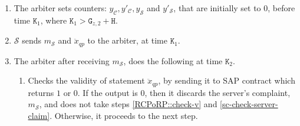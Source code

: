 \begin{enumerate}
\begin{enumerate}




 
 

\item The arbiter sets  counters: $y_{\scriptscriptstyle\mathcal C}, y'_{\scriptscriptstyle\mathcal C},y_{\scriptscriptstyle\mathcal S}$ and  $y'_{\scriptscriptstyle\mathcal S}$, that are initially set to $0$,  before time $\texttt{K}_{\scriptscriptstyle 1}$,  where $\texttt{K}_{\scriptscriptstyle 1}>\texttt{G}_{\scriptscriptstyle z,2}+\texttt{H}$. 

\item $\mathcal S$  sends ${m}_{\scriptscriptstyle\mathcal S}$ and $\ddot{x}_{\scriptscriptstyle qp}$ to the arbiter, at time $\texttt{K}_{\scriptscriptstyle 1}$.

\item The arbiter after receiving ${m}_{\scriptscriptstyle\mathcal S}$, does the following at time $\texttt{K}_{\scriptscriptstyle 2}$. 
\begin{enumerate}



\item Checks the validity of  statement $\ddot{x}_{\scriptscriptstyle qp}$, by  sending it to SAP contract which  returns   $1$ or $0$. If the output is $0$, then it discards the server's complaint, $m_{\scriptscriptstyle\mathcal S}$, and does not take steps \ref{RCPoRP::check-v} and \ref{sc-check-server-claim}. Otherwise, it proceeds to the next step.


\end{enumerate}
\end{enumerate}
\end{enumerate}
